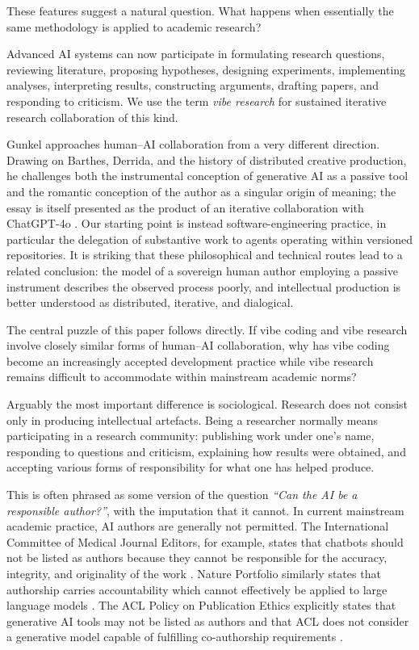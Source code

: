 These features suggest a natural question. What happens when essentially the same methodology is applied to academic research?

Advanced AI systems can now participate in formulating research questions, reviewing literature, proposing hypotheses, designing experiments, implementing analyses, interpreting results, constructing arguments, drafting papers, and responding to criticism. We use the term \emph{vibe research} for sustained iterative research collaboration of this kind.

Gunkel approaches human--AI collaboration from a very different direction. Drawing on Barthes, Derrida, and the history of distributed creative production, he challenges both the instrumental conception of generative AI as a passive tool and the romantic conception of the author as a singular origin of meaning; the essay is itself presented as the product of an iterative collaboration with ChatGPT-4o \citep{gunkel2025prompted}. Our starting point is instead software-engineering practice, in particular the delegation of substantive work to agents operating within versioned repositories. It is striking that these philosophical and technical routes lead to a related conclusion: the model of a sovereign human author employing a passive instrument describes the observed process poorly, and intellectual production is better understood as distributed, iterative, and dialogical.

The central puzzle of this paper follows directly. If vibe coding and vibe research involve closely similar forms of human--AI collaboration, why has vibe coding become an increasingly accepted development practice while vibe research remains difficult to accommodate within mainstream academic norms?

Arguably the most important difference is sociological. Research does not consist only in producing intellectual artefacts. Being a researcher normally means participating in a research community: publishing work under one's name, responding to questions and criticism, explaining how results were obtained, and accepting various forms of responsibility for what one has helped produce.

This is often phrased as some version of the question \emph{``Can the AI be a responsible author?''}, with the imputation that it cannot. In current mainstream academic practice, AI authors are generally not permitted. The International Committee of Medical Journal Editors, for example, states that chatbots should not be listed as authors because they cannot be responsible for the accuracy, integrity, and originality of the work \citep{icmje2026ai}. Nature Portfolio similarly states that authorship carries accountability which cannot effectively be applied to large language models \citep{nature2026ai}. The ACL Policy on Publication Ethics explicitly states that generative AI tools may not be listed as authors and that ACL does not consider a generative model capable of fulfilling co-authorship requirements \citep{acl2026policy}.

